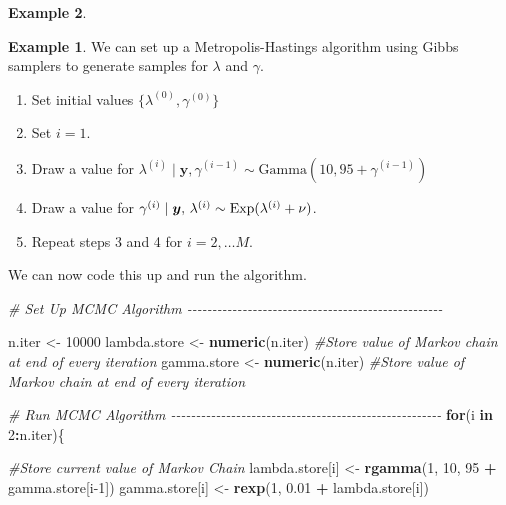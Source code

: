 \documentclass[
]{book}
\newenvironment{Shaded}{\begin{snugshade}}{\end{snugshade}}
\newcommand{\CommentTok}[1]{\textcolor[rgb]{0.56,0.35,0.01}{\textit{#1}}}
\newcommand{\ControlFlowTok}[1]{\textcolor[rgb]{0.13,0.29,0.53}{\textbf{#1}}}
\newcommand{\DecValTok}[1]{\textcolor[rgb]{0.00,0.00,0.81}{#1}}
\newcommand{\FloatTok}[1]{\textcolor[rgb]{0.00,0.00,0.81}{#1}}
\newcommand{\FunctionTok}[1]{\textcolor[rgb]{0.13,0.29,0.53}{\textbf{#1}}}
\newcommand{\NormalTok}[1]{#1}
\newcommand{\OtherTok}[1]{\textcolor[rgb]{0.56,0.35,0.01}{#1}}
\newcommand{\SpecialCharTok}[1]{\textcolor[rgb]{0.81,0.36,0.00}{\textbf{#1}}}
\theoremstyle{definition}
\theoremstyle{definition}
\newtheorem{example}{Example}[chapter]
\theoremstyle{definition}
\theoremstyle{definition}
\theoremstyle{remark}
\begin{document}
\begin{example}
\begin{example}
We can set up a Metropolis-Hastings algorithm using Gibbs samplers to generate samples for \(\lambda\) and \(\gamma\).

\begin{enumerate}
\def\labelenumi{\arabic{enumi}.}
\item
  Set initial values \(\{\lambda^{(0)}, \gamma^{(0)}\}\)
\item
  Set \(i = 1\).
\item
  Draw a value for \(\lambda^{(i)} \mid \boldsymbol{y}, \gamma^{(i-1)} \sim \textrm{Gamma}(10, 95 + \gamma^{(i-1)})\)
\item
  Draw a value for \(\gamma^{(i)} \mid \boldsymbol{y}, \,\lambda^{(i)} \sim \hbox{Exp}(\lambda^{(i)} + \nu)\).
\item
  Repeat steps 3 and 4 for \(i = 2, \ldots M\).
\end{enumerate}

We can now code this up and run the algorithm.

\begin{Shaded}
\begin{Highlighting}[]
\CommentTok{\# Set Up MCMC Algorithm {-}{-}{-}{-}{-}{-}{-}{-}{-}{-}{-}{-}{-}{-}{-}{-}{-}{-}{-}{-}{-}{-}{-}{-}{-}{-}{-}{-}{-}{-}{-}{-}{-}{-}{-}{-}{-}{-}{-}{-}{-}{-}{-}{-}{-}{-}{-}{-}{-}{-}{-}}

\NormalTok{n.iter }\OtherTok{\textless{}{-}} \DecValTok{10000}
\NormalTok{lambda.store }\OtherTok{\textless{}{-}} \FunctionTok{numeric}\NormalTok{(n.iter) }\CommentTok{\#Store value of Markov chain at end of every iteration}
\NormalTok{gamma.store }\OtherTok{\textless{}{-}} \FunctionTok{numeric}\NormalTok{(n.iter) }\CommentTok{\#Store value of Markov chain at end of every iteration}



\CommentTok{\# Run MCMC Algorithm {-}{-}{-}{-}{-}{-}{-}{-}{-}{-}{-}{-}{-}{-}{-}{-}{-}{-}{-}{-}{-}{-}{-}{-}{-}{-}{-}{-}{-}{-}{-}{-}{-}{-}{-}{-}{-}{-}{-}{-}{-}{-}{-}{-}{-}{-}{-}{-}{-}{-}{-}{-}{-}{-}}
\ControlFlowTok{for}\NormalTok{(i }\ControlFlowTok{in} \DecValTok{2}\SpecialCharTok{:}\NormalTok{n.iter)\{}
  
  \CommentTok{\#Store current value of Markov Chain}
\NormalTok{  lambda.store[i] }\OtherTok{\textless{}{-}} \FunctionTok{rgamma}\NormalTok{(}\DecValTok{1}\NormalTok{, }\DecValTok{10}\NormalTok{, }\DecValTok{95} \SpecialCharTok{+}\NormalTok{ gamma.store[i}\DecValTok{{-}1}\NormalTok{])}
\NormalTok{  gamma.store[i]  }\OtherTok{\textless{}{-}} \FunctionTok{rexp}\NormalTok{(}\DecValTok{1}\NormalTok{, }\FloatTok{0.01} \SpecialCharTok{+}\NormalTok{ lambda.store[i])}
  

\end{Highlighting}
\end{Shaded}
\end{example}
\end{example}
\end{document}
